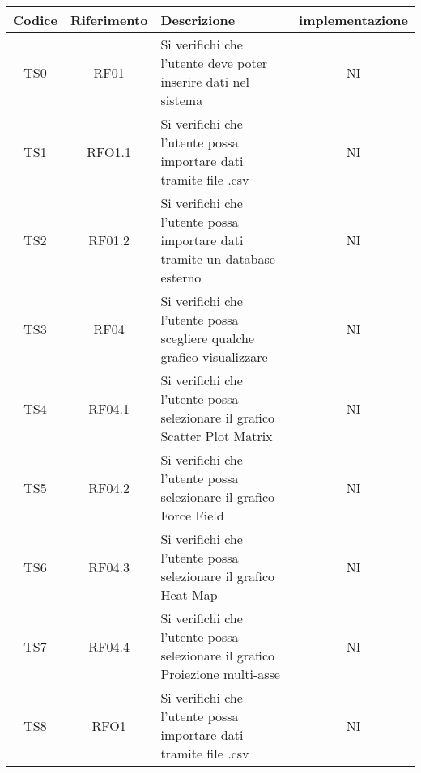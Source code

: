 \documentclass[../piano_di_qualifica.tex]{subfiles}
\begin{document}
\begin{center}
	\begin{longtable}{|c|c|p{8.5cm}|c|}
		\hline
		\rowcolor{lightgray}
		{\textbf{Codice}}                & {\textbf{Riferimento}} & {\textbf{Descrizione}}                                                                                            & {\textbf{implementazione}} \\
		\hline
		TS0                              & RF01                   & Si verifichi che l'utente deve poter inserire dati nel sistema                                                    & NI                         \\ \hline
		TS1                              & RFO1.1                 & Si verifichi che l'utente possa importare dati tramite file .csv                                                  & NI                         \\ \hline
		TS2                              & RF01.2                 & Si verifichi che l'utente possa importare dati tramite un database esterno                                        & NI                         \\ \hline
		TS3                              & RF04                   & Si verifichi che l'utente possa scegliere qualche grafico visualizzare                                            & NI                         \\ \hline
		TS4                              & RF04.1                 & Si verifichi che l'utente possa selezionare il grafico Scatter Plot Matrix                                        & NI                         \\ \hline
		TS5                              & RF04.2                 & Si verifichi che l'utente possa selezionare il grafico Force Field                                                & NI                         \\ \hline
		TS6                              & RF04.3                 & Si verifichi che l'utente possa selezionare il grafico Heat Map                                                   & NI                         \\ \hline
		TS7                              & RF04.4                 & Si verifichi che l'utente possa selezionare il grafico Proiezione multi-asse                                      & NI                         \\ \hline
		TS8                              & RFO1                   & Si verifichi che l'utente possa importare dati tramite file .csv                                                  & NI                         \\ \hline

\end{longtable}
\end{center}
\end{document}
